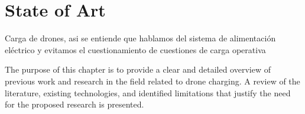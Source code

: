 
\section{State of Art}
Carga de drones, asi se entiende que hablamos del sistema de alimentación eléctrico y evitamos 
el cuestionamiento de cuestiones de carga operativa

The purpose of this chapter is to provide a clear and detailed overview of previous work and research in the field related to drone charging. A review of the literature, existing technologies, and identified limitations that justify the need for the proposed research is presented.








    




